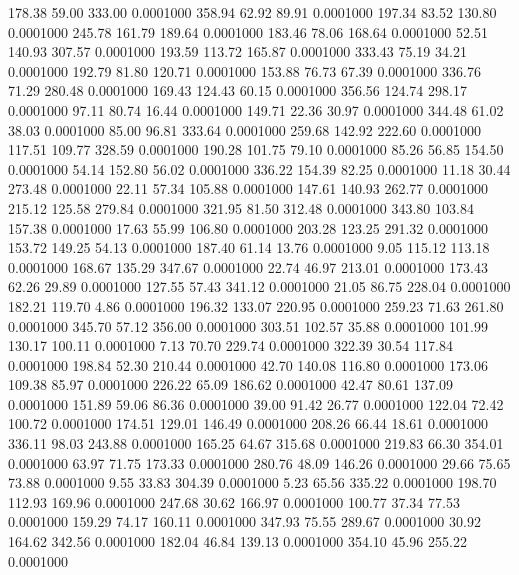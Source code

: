  178.38   59.00  333.00   0.0001000
 358.94   62.92   89.91   0.0001000
 197.34   83.52  130.80   0.0001000
 245.78  161.79  189.64   0.0001000
 183.46   78.06  168.64   0.0001000
  52.51  140.93  307.57   0.0001000
 193.59  113.72  165.87   0.0001000
 333.43   75.19   34.21   0.0001000
 192.79   81.80  120.71   0.0001000
 153.88   76.73   67.39   0.0001000
 336.76   71.29  280.48   0.0001000
 169.43  124.43   60.15   0.0001000
 356.56  124.74  298.17   0.0001000
  97.11   80.74   16.44   0.0001000
 149.71   22.36   30.97   0.0001000
 344.48   61.02   38.03   0.0001000
  85.00   96.81  333.64   0.0001000
 259.68  142.92  222.60   0.0001000
 117.51  109.77  328.59   0.0001000
 190.28  101.75   79.10   0.0001000
  85.26   56.85  154.50   0.0001000
  54.14  152.80   56.02   0.0001000
 336.22  154.39   82.25   0.0001000
  11.18   30.44  273.48   0.0001000
  22.11   57.34  105.88   0.0001000
 147.61  140.93  262.77   0.0001000
 215.12  125.58  279.84   0.0001000
 321.95   81.50  312.48   0.0001000
 343.80  103.84  157.38   0.0001000
  17.63   55.99  106.80   0.0001000
 203.28  123.25  291.32   0.0001000
 153.72  149.25   54.13   0.0001000
 187.40   61.14   13.76   0.0001000
   9.05  115.12  113.18   0.0001000
 168.67  135.29  347.67   0.0001000
  22.74   46.97  213.01   0.0001000
 173.43   62.26   29.89   0.0001000
 127.55   57.43  341.12   0.0001000
  21.05   86.75  228.04   0.0001000
 182.21  119.70    4.86   0.0001000
 196.32  133.07  220.95   0.0001000
 259.23   71.63  261.80   0.0001000
 345.70   57.12  356.00   0.0001000
 303.51  102.57   35.88   0.0001000
 101.99  130.17  100.11   0.0001000
   7.13   70.70  229.74   0.0001000
 322.39   30.54  117.84   0.0001000
 198.84   52.30  210.44   0.0001000
  42.70  140.08  116.80   0.0001000
 173.06  109.38   85.97   0.0001000
 226.22   65.09  186.62   0.0001000
  42.47   80.61  137.09   0.0001000
 151.89   59.06   86.36   0.0001000
  39.00   91.42   26.77   0.0001000
 122.04   72.42  100.72   0.0001000
 174.51  129.01  146.49   0.0001000
 208.26   66.44   18.61   0.0001000
 336.11   98.03  243.88   0.0001000
 165.25   64.67  315.68   0.0001000
 219.83   66.30  354.01   0.0001000
  63.97   71.75  173.33   0.0001000
 280.76   48.09  146.26   0.0001000
  29.66   75.65   73.88   0.0001000
   9.55   33.83  304.39   0.0001000
   5.23   65.56  335.22   0.0001000
 198.70  112.93  169.96   0.0001000
 247.68   30.62  166.97   0.0001000
 100.77   37.34   77.53   0.0001000
 159.29   74.17  160.11   0.0001000
 347.93   75.55  289.67   0.0001000
  30.92  164.62  342.56   0.0001000
 182.04   46.84  139.13   0.0001000
 354.10   45.96  255.22   0.0001000
